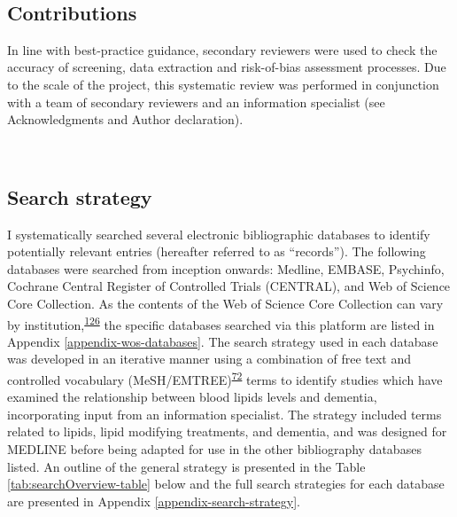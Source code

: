\documentclass[a4paper, twoside]{templates/ociamthesis}
\begin{document}
~

\hypertarget{contributions}{%
\subsection{Contributions}\label{contributions}}

In line with best-practice guidance, secondary reviewers were used to check the accuracy of screening, data extraction and risk-of-bias assessment processes. Due to the scale of the project, this systematic review was performed in conjunction with a team of secondary reviewers and an information specialist (see Acknowledgments and Author declaration).

~

\hypertarget{search-strategy}{%
\subsection{Search strategy}\label{search-strategy}}

I systematically searched several electronic bibliographic databases to identify potentially relevant entries (hereafter referred to as ``records''). The following databases were searched from inception onwards: Medline, EMBASE, Psychinfo, Cochrane Central Register of Controlled Trials (CENTRAL), and Web of Science Core Collection. As the contents of the Web of Science Core Collection can vary by institution,\textsuperscript{\protect\hyperlink{ref-gusenbauer2020a}{126}} the specific databases searched via this platform are listed in Appendix \ref{appendix-wos-databases}. The search strategy used in each database was developed in an iterative manner using a combination of free text and controlled vocabulary (MeSH/EMTREE)\textsuperscript{\protect\hyperlink{ref-lefebvre2019searching}{72}} terms to identify studies which have examined the relationship between blood lipids levels and dementia, incorporating input from an information specialist. The strategy included terms related to lipids, lipid modifying treatments, and dementia, and was designed for MEDLINE before being adapted for use in the other bibliography databases listed. An outline of the general strategy is presented in the Table \ref{tab:searchOverview-table} below and the full search strategies for each database are presented in Appendix \ref{appendix-search-strategy}.

~
\end{document}
